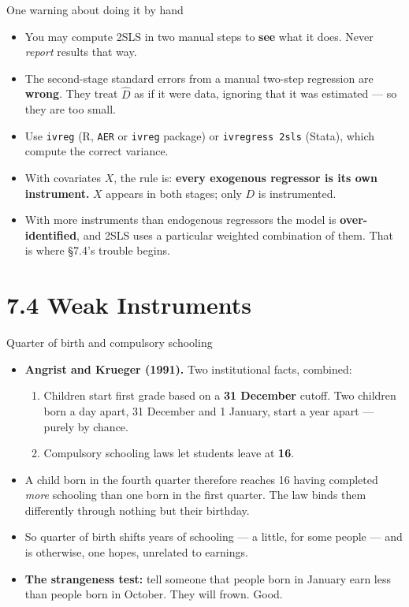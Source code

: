 \documentclass[
  11pt,
  ignorenonframetext,
  aspectratio=169,
]{beamer}
\providecommand{\tightlist}{%
  \setlength{\itemsep}{0pt}\setlength{\parskip}{0pt}}
\begin{document}
\begin{frame}[fragile]{One warning about doing it by hand}
\protect{}\label{one-warning-about-doing-it-by-hand}
\begin{itemize}
\tightlist
\item
  You may compute 2SLS in two manual steps to \textbf{see} what it does.
  Never \emph{report} results that way.
\item
  The second-stage standard errors from a manual two-step regression are
  \textbf{wrong}. They treat \(\hat D\) as if it were data, ignoring
  that it was estimated --- so they are too small.
\item
  Use \texttt{ivreg} (R, \texttt{AER} or \texttt{ivreg} package) or
  \texttt{ivregress\ 2sls} (Stata), which compute the correct variance.
\item
  With covariates \(X\), the rule is: \textbf{every exogenous regressor
  is its own instrument.} \(X\) appears in both stages; only \(D\) is
  instrumented.
\item
  With more instruments than endogenous regressors the model is
  \textbf{over-identified}, and 2SLS uses a particular weighted
  combination of them. That is where §7.4's trouble begins.
\end{itemize}
\end{frame}

\section{7.4 Weak Instruments}\label{weak-instruments}

\begin{frame}{Quarter of birth and compulsory schooling}
\protect{}\label{quarter-of-birth-and-compulsory-schooling}
\begin{itemize}
\tightlist
\item
  \textbf{Angrist and Krueger (1991).} Two institutional facts,
  combined:

  \begin{enumerate}
  \tightlist
  \item
    Children start first grade based on a \textbf{31 December} cutoff.
    Two children born a day apart, 31 December and 1 January, start a
    year apart --- purely by chance.
  \item
    Compulsory schooling laws let students leave at \textbf{16}.
  \end{enumerate}
\item
  A child born in the fourth quarter therefore reaches 16 having
  completed \emph{more} schooling than one born in the first quarter.
  The law binds them differently through nothing but their birthday.
\item
  So quarter of birth shifts years of schooling --- a little, for some
  people --- and is otherwise, one hopes, unrelated to earnings.
\item
  \textbf{The strangeness test:} tell someone that people born in
  January earn less than people born in October. They will frown. Good.
\end{itemize}
\end{frame}
\end{document}
